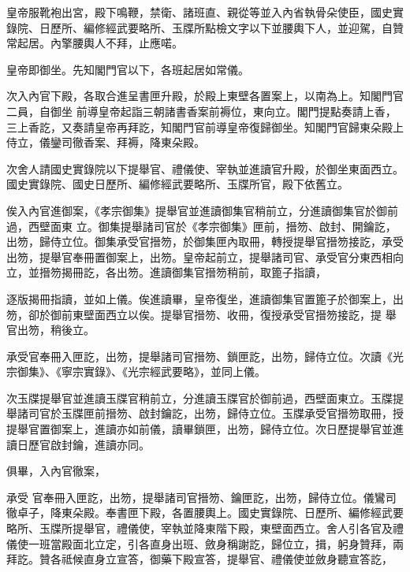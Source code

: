 \begin{pinyinscope}
 皇帝服靴袍出宮，殿下鳴鞭，禁衛、諸班直、親從等並入內省執骨朵使臣，國史實錄院、日歷所、編修經武要略所、玉牒所點檢文字以下並腰輿下人，並迎駕，自贊常起居。內擎腰輿人不拜，止應喏。



 皇帝即御坐。先知閣門官以下，各班起居如常儀。



 次入內官下殿，各取合進呈書匣升殿，於殿上東壁各置案上，以南為上。知閣門官二員，自御坐
 前導皇帝起詣三朝諸書香案前褥位，東向立。閣門提點奏請上香，三上香訖，又奏請皇帝再拜訖，知閣門官前導皇帝復歸御坐。知閣門官歸東朵殿上侍立，儀鑾司徹香案、拜褥，降東朵殿。



 次舍人請國史實錄院以下提舉官、禮儀使、宰執並進讀官升殿，於御坐東面西立。國史實錄院、國史日歷所、編修經武要略所、玉牒所官，殿下依舊立。



 俟入內官進御案，《孝宗御集》提舉官並進讀御集官稍前立，分進讀御集官於御前過，西壁面東
 立。御集提舉諸司官於《孝宗御集》匣前，搢笏、啟封、開鑰訖，出笏，歸侍立位。御集承受官搢笏，於御集匣內取冊，轉授提舉官搢笏接訖，承受出笏，提舉官奉冊置御案上，出笏。皇帝起前立，提舉諸司官、承受官分東西相向立，並搢笏揭冊訖，各出笏。進讀御集官搢笏稍前，取篦子指讀，



 逐版揭冊指讀，並如上儀。俟進讀畢，皇帝復坐，進讀御集官置篦子於御案上，出笏，卻於御前東壁面西立以俟。提舉官搢笏、收冊，復授承受官搢笏接訖，提
 舉官出笏，稍後立。



 承受官奉冊入匣訖，出笏，提舉諸司官搢笏、鎖匣訖，出笏，歸侍立位。次讀《光宗御集》、《寧宗實錄》、《光宗經武要略》，並同上儀。



 次玉牒提舉官並進讀玉牒官稍前立，分進讀玉牒官於御前過，西壁面東立。玉牒提舉諸司官於玉牒匣前搢笏、啟封鑰訖，出笏，歸侍立位。玉牒承受官搢笏取冊，授提舉官置御案上，進讀亦如前儀，讀畢鎖匣，出笏，歸侍立位。次日歷提舉官並進讀日歷官啟封鑰，進讀亦同。



 俱畢，入內官徹案，



 承受
 官奉冊入匣訖，出笏，提舉諸司官搢笏、鑰匣訖，出笏，歸侍立位。儀鸞司徹卓子，降東朵殿。奉書匣下殿，各置腰輿上。國史實錄院、日歷所、編修經武要略所、玉牒所提舉官，禮儀使，宰執並降東階下殿，東壁面西立。舍人引各官及禮儀使一班當殿面北立定，引各直身出班、斂身稱謝訖，歸位立，揖，躬身贊拜，兩拜訖。贊各祗候直身立宣答，御藥下殿宣答，提舉官、禮儀使並斂身聽宣答訖，




\end{pinyinscope}
